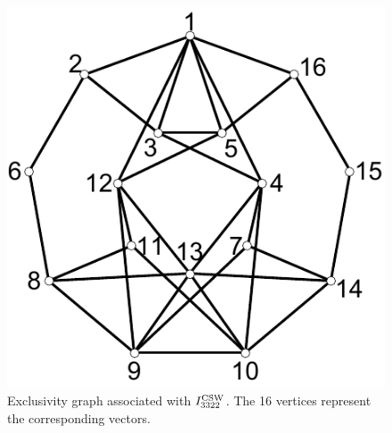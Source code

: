 \documentclass[prl,letterpaper,english,reprint,nofootinbib,aps,superscriptaddress,showpacs,showkeys]{revtex4-1}
\theoremstyle{definition}
\theoremstyle{remark}
\begin{document}
\begin{figure}[t]
\centering
\includegraphics[scale=0.6]{i3322.pdf}
\caption{\label{Fig7}Exclusivity graph associated with $I_{3322}^{\rm CSW}$.
The 16 vertices represent the corresponding vectors.}
\end{figure}
\end{document}
